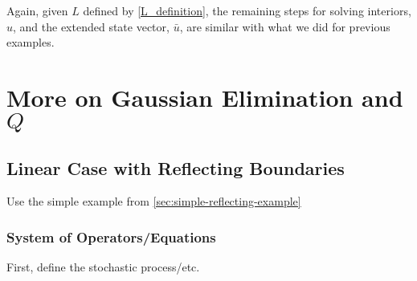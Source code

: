 \documentclass[11pt]{article}
\begin{document}
Again, given $L$ defined by \cref{L_definition}, the remaining steps for solving interiors, $u$, and the extended state vector, $\bar{u}$, are similar with what we did for previous examples.

\appendix
\section{More on Gaussian Elimination and $Q$}
\subsection{Linear Case with Reflecting Boundaries}
Use the simple example from \cref{sec:simple-reflecting-example}
\subsubsection{System of Operators/Equations}
First, define the stochastic process/etc.
\end{document}

